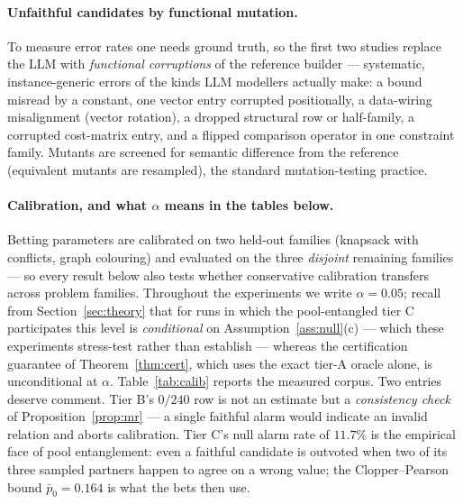 \documentclass[pdflatex,sn-mathphys-num]{sn-jnl}
\theoremstyle{thmstyleone}
\theoremstyle{thmstyletwo}
\begin{document}
\paragraph{Unfaithful candidates by functional mutation.}
To measure error rates one needs ground truth, so the first two
studies replace the LLM with \emph{functional corruptions} of the
reference builder --- systematic, instance-generic errors of the
kinds LLM modellers actually make: a bound misread by a constant, one
vector entry corrupted positionally, a data-wiring misalignment
(vector rotation), a dropped structural row or half-family, a
corrupted cost-matrix entry, and a flipped comparison operator in one
constraint family. Mutants are screened for semantic difference from
the reference (equivalent mutants are resampled), the standard
mutation-testing practice.

\paragraph{Calibration, and what $\alpha$ means in the tables below.}
Betting parameters are calibrated on two held-out families (knapsack
with conflicts, graph colouring) and evaluated on the three
\emph{disjoint} remaining families --- so every result below also
tests whether conservative calibration transfers across problem
families. Throughout the experiments we write $\alpha = 0.05$; recall from
Section~\ref{sec:theory} that for runs in which the pool-entangled
tier C participates this level is \emph{conditional} on
Assumption~\ref{ass:null}(c) --- which these experiments stress-test
rather than establish --- whereas the certification guarantee of
Theorem~\ref{thm:cert}, which uses the exact tier-A oracle alone, is
unconditional at $\alpha$. Table~\ref{tab:calib} reports the measured corpus. Two
entries deserve comment. Tier B's $0/240$ row is not an estimate but
a \emph{consistency check} of Proposition~\ref{prop:mr} --- a single
faithful alarm would indicate an invalid relation and aborts
calibration. Tier C's null alarm rate of $11.7\%$ is the empirical
face of pool entanglement: even a faithful candidate is outvoted when
two of its three sampled partners happen to agree on a wrong value;
the Clopper--Pearson bound $\bar p_0 = 0.164$ is what the bets then
use.
\end{document}
